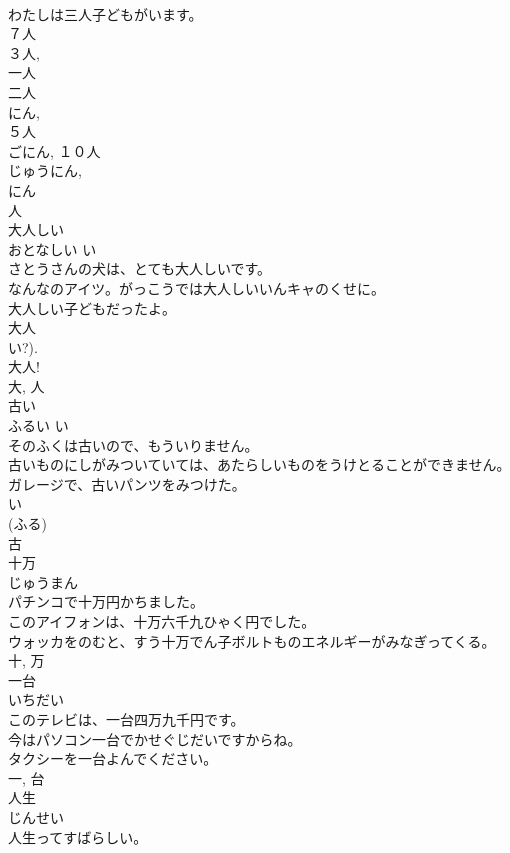 \documentclass[8pt]{extreport}
\begin{document}
\begin{CJK}{UTF8}{min}
\\	わたしは三人子どもがいます。	
\\	７人 
\\	３人, 
\\	一人 
\\	二人 
\\	にん, 
\\	５人 
\\	ごにん, １０人 
\\	じゅうにん, 
\\	にん 
\\	人	
\\	大人しい	
\\	おとなしい	い 
\\	さとうさんの犬は、とても大人しいです。	
\\	なんなのアイツ。がっこうでは大人しいいんキャのくせに。	
\\	大人しい子どもだったよ。	
\\	大人 
\\	い?). 
\\	大人! 
\\	大, 人	
\\	古い	
\\	ふるい	い 
\\	そのふくは古いので、もういりません。	
\\	古いものにしがみついていては、あたらしいものをうけとることができません。	
\\	ガレージで、古いパンツをみつけた。	
\\	い 
\\	(ふる) 
\\	古	
\\	十万	
\\	じゅうまん	
\\	パチンコで十万円かちました。	
\\	このアイフォンは、十万六千九ひゃく円でした。	
\\	ウォッカをのむと、すう十万でん子ボルトものエネルギーがみなぎってくる。	
\\	十, 万	
\\	一台	
\\	いちだい	
\\	このテレビは、一台四万九千円です。	
\\	今はパソコン一台でかせぐじだいですからね。	
\\	タクシーを一台よんでください。	
\\	一, 台	
\\	人生	
\\	じんせい	
\\	人生ってすばらしい。	

\end{CJK}
\end{document}
